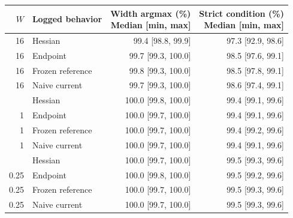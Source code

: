 \begin{tabular}{@{}rlrr@{}}
\toprule
$W$ & Logged behavior & \shortstack{Width argmax (\%)\\Median [min, max]} & \shortstack{Strict condition (\%)\\Median [min, max]} \\
\midrule
16 & Hessian & 99.4 [98.8, 99.9] & 97.3 [92.9, 98.6] \\
16 & Endpoint & 99.7 [99.3, 100.0] & 98.5 [97.6, 99.1] \\
16 & Frozen reference & 99.8 [99.3, 100.0] & 98.5 [97.8, 99.1] \\
16 & Naive current & 99.7 [99.3, 100.0] & 98.6 [97.4, 99.1] \\
\addlinespace
1 & Hessian & 100.0 [99.8, 100.0] & 99.4 [99.1, 99.6] \\
1 & Endpoint & 100.0 [99.7, 100.0] & 99.4 [99.1, 99.6] \\
1 & Frozen reference & 100.0 [99.7, 100.0] & 99.4 [99.2, 99.6] \\
1 & Naive current & 100.0 [99.7, 100.0] & 99.4 [99.1, 99.6] \\
\addlinespace
0.25 & Hessian & 100.0 [99.7, 100.0] & 99.5 [99.3, 99.6] \\
0.25 & Endpoint & 100.0 [99.8, 100.0] & 99.5 [99.2, 99.6] \\
0.25 & Frozen reference & 100.0 [99.7, 100.0] & 99.5 [99.3, 99.6] \\
0.25 & Naive current & 100.0 [99.7, 100.0] & 99.5 [99.3, 99.6] \\
\bottomrule
\end{tabular}
